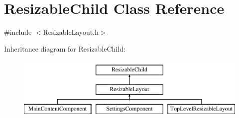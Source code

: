 \hypertarget{class_resizable_child}{}\section{Resizable\+Child Class Reference}
\label{class_resizable_child}


{\ttfamily \#include $<$Resizable\+Layout.\+h$>$}

Inheritance diagram for Resizable\+Child\+:\begin{figure}[H]
\begin{center}
\leavevmode
\includegraphics[height=3.000000cm]{class_resizable_child}
\end{center}
\end{figure}
